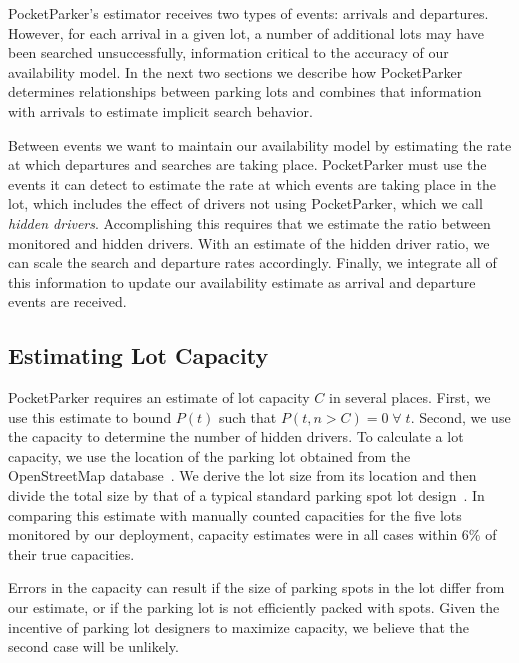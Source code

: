 PocketParker's estimator receives two types of events: arrivals and
departures. However, for each arrival in a given lot, a number of additional
lots may have been searched unsuccessfully, information critical to the
accuracy of our availability model. In the next two sections we describe how
PocketParker determines relationships between parking lots and combines that
information with arrivals to estimate implicit search behavior.

Between events we want to maintain our availability model by estimating the
rate at which departures and searches are taking place. PocketParker must use
the events it can detect to estimate the rate at which events are taking
place in the lot, which includes the effect of drivers not using
PocketParker, which we call \textit{hidden drivers}. Accomplishing this
requires that we estimate the ratio between monitored and hidden drivers.
With an estimate of the hidden driver ratio, we can scale the search and
departure rates accordingly. Finally, we integrate all of this information to
update our availability estimate as arrival and departure events are
received.

\subsection{Estimating Lot Capacity}
\label{subsec-capacity}

PocketParker requires an estimate of lot capacity $C$ in several places.
First, we use this estimate to bound $P(t)$ such that $P(t, n > C) =
0\;\forall\;t$. Second, we use the capacity to determine the number of hidden
drivers. To calculate a lot capacity, we use the location of the parking lot
obtained from the OpenStreetMap database~\cite{openstreetmap}.  We derive the
lot size from its location and then divide the total size by that of a
typical standard parking spot lot design~\cite{parkingdesign}.  In comparing
this estimate with manually counted capacities for the five lots monitored by
our deployment, capacity estimates were in all cases within 6\% of their true
capacities.

Errors in the capacity can result if the size of parking spots in the lot
differ from our estimate, or if the parking lot is not efficiently packed
with spots. Given the incentive of parking lot designers to maximize
capacity, we believe that the second case will be unlikely. 


